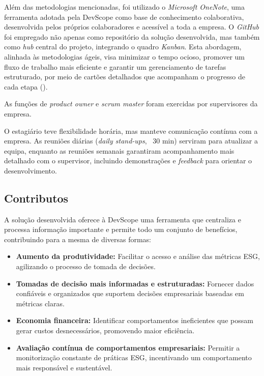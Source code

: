 Além das metodologias mencionadas, foi utilizado o \textit{Microsoft OneNote}, uma ferramenta adotada pela DevScope como base de conhecimento colaborativa, desenvolvida pelos próprios colaboradores e acessível a toda a empresa. O \textit{GitHub} foi empregado não apenas como repositório da solução desenvolvida, mas também como \textit{hub} central do projeto, integrando o quadro \textit{Kanban}. Esta abordagem, alinhada às metodologias ágeis, visa minimizar o tempo ocioso, promover um fluxo de trabalho mais eficiente e garantir um gerenciamento de tarefas estruturado, por meio de cartões detalhados que acompanham o progresso de cada etapa (\cite{Wakode2021Kanban}).

As funções de \textit{product owner} e \textit{scrum master} foram exercidas por supervisores da empresa.

O estagiário teve flexibilidade horária, mas manteve comunicação contínua com a empresa. As reuniões diárias (\textit{daily stand-ups}, ~30 min) serviram para atualizar a equipa, enquanto as reuniões semanais garantiram acompanhamento mais detalhado com o supervisor, incluindo demonstrações e \textit{feedback} para orientar o desenvolvimento.

\subsection{Contributos}

A solução desenvolvida oferece à DevScope uma ferramenta que centraliza e processa informação importante e permite todo um conjunto de benefícios, contribuindo para a mesma de diversas formas:
\begin{itemize}
  \item \textbf{Aumento da produtividade:} Facilitar o acesso e análise das métricas ESG, agilizando o processo de tomada de decisões.
  \item \textbf{Tomadas de decisão mais informadas e estruturadas:} Fornecer dados confiáveis e organizados que suportem decisões empresariais baseadas em métricas claras.
  \item \textbf{Economia financeira:} Identificar comportamentos ineficientes que possam gerar custos desnecessários, promovendo maior eficiência.
  \item \textbf{Avaliação contínua de comportamentos empresariais:} Permitir a monitorização constante de práticas ESG, incentivando um comportamento mais responsável e sustentável.
\end{itemize}

